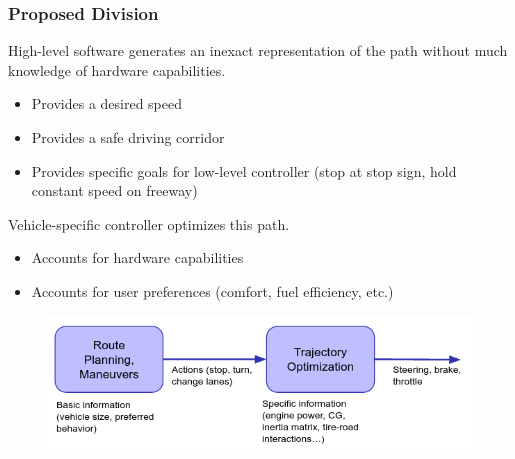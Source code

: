 \documentclass{beamer}
\begin{document}
	
	

\begin{frame}
\frametitle{Proposed Division}
High-level software generates an inexact representation of the path without much knowledge of hardware capabilities.
\begin{itemize}
\item Provides a desired speed
\item Provides a safe driving corridor
\item Provides specific goals for low-level controller (stop at stop sign, hold constant speed on freeway)
\end{itemize}

Vehicle-specific controller optimizes this path.
\begin{itemize}
\item Accounts for hardware capabilities
\item Accounts for user preferences (comfort, fuel efficiency, etc.)
\end{itemize}
\vspace{-0.5em}
\begin{figure}
\includegraphics[width=0.8\linewidth]{figures/division.png}
\end{figure}
\end{frame}
\end{document}
